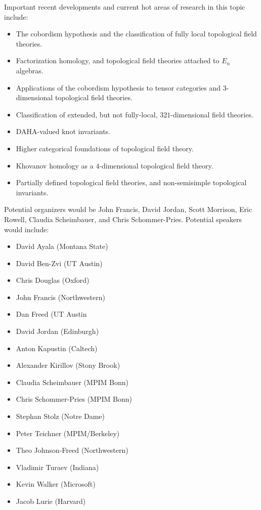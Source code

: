 \documentclass[12pt]{article}
\begin{document}
Important recent developments and current hot areas of research in this topic include:
\begin{itemize}
  \setlength{\itemsep}{1pt}
  \setlength{\parskip}{0pt}
  \setlength{\parsep}{0pt}\item The cobordism hypothesis and the classification of fully local topological field theories.
\item Factorization homology, and topological field theories attached to $E_n$ algebras.
\item Applications of the cobordism hypothesis to tensor categories and $3$-dimensional topological field theories.
\item Classification of extended, but not fully-local, $321$-dimensional field theories.
\item DAHA-valued knot invariants.
\item Higher categorical foundations of topological field theory.
\item Khovanov homology as a $4$-dimensional topological field theory.
\item Partially defined topological field theories, and non-semisimple topological invariants.
\end{itemize}



Potential organizers would be John Francis, David Jordan, Scott Morrison, Eric Rowell, Claudia Scheimbauer, and Chris Schommer-Pries.
Potential speakers would include:
\begin{multicols}{2}
\begin{itemize}
  \setlength{\itemsep}{1pt}
  \setlength{\parskip}{0pt}
  \setlength{\parsep}{0pt}
\item David Ayala	(Montana State)
\item David Ben-Zvi (UT Austin)
\item Chris Douglas	(Oxford)
\item John Francis (Northwestern)
\item Dan Freed	(UT Austin
\item David Jordan (Edinburgh)
\item Anton Kapustin	(Caltech)
\item Alexander Kirillov	(Stony Brook)
\item Claudia Scheimbauer	(MPIM Bonn)
\item Chris Schommer-Pries	(MPIM Bonn)
\item Stephan Stolz	(Notre Dame)
\item Peter Teichner	(MPIM/Berkeley)
\item Theo Johnson-Freed	(Northwestern)
\item Vladimir Turaev	(Indiana)
\item Kevin Walker (Microsoft)
\item Jacob Lurie (Harvard)
\end{itemize}
\end{multicols}
\end{document}
